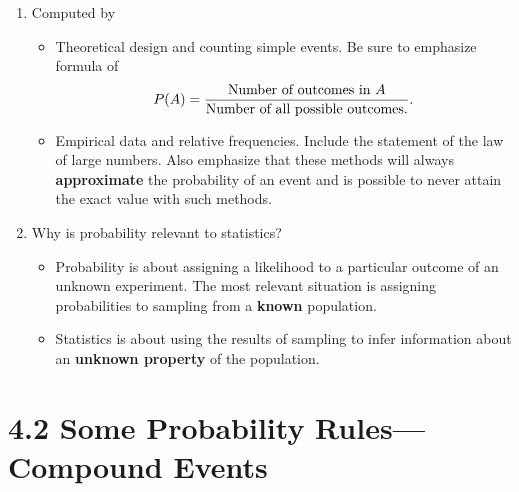 \documentclass{article}
\begin{document}
\begin{enumerate}
\begin{itemize}
        \end{itemize}
        
    \item Computed by
    
        \begin{itemize}
        
            \item Theoretical design and counting simple events.  Be sure to emphasize formula of $$P(A)=\frac{\textnormal{Number of outcomes in } A}{\textnormal{Number of all possible outcomes.}}.$$
            
            
            \item Empirical data and relative frequencies. Include the statement of the law of large numbers. Also emphasize that these methods will always \textbf{approximate} the probability of an event and is possible to never attain the exact value with such methods.
            
        \end{itemize}
        
    \item Why is probability relevant to statistics?
    
        \begin{itemize}
        
            \item Probability is about assigning a likelihood to a particular outcome of an unknown experiment. The most relevant situation is assigning probabilities to sampling from a \textbf{known} population.
            
            \item Statistics is about using the results of sampling to infer information about an \textbf{unknown property} of the population.
            
        \end{itemize}
    
\end{enumerate}

\newpage

\section*{4.2 Some Probability Rules---Compound Events}
\end{document}
